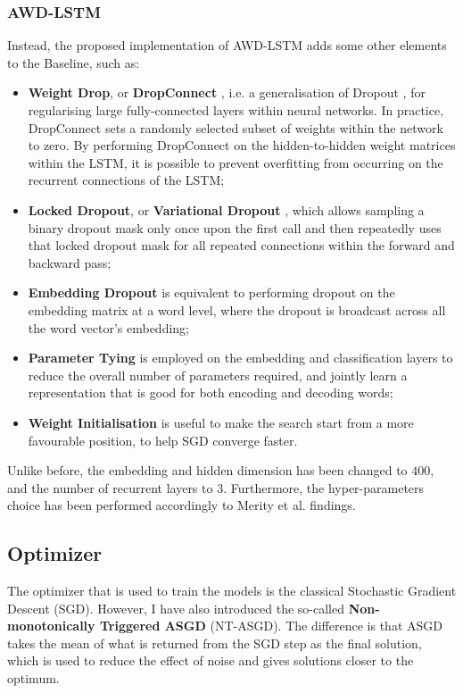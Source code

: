 \subsubsection{AWD-LSTM}
Instead, the proposed implementation of AWD-LSTM adds some other elements to the Baseline, such as:
\begin{itemize}
    \item \textbf{Weight Drop}, or \textbf{DropConnect} \cite{wanRegularizationNeuralNetworks2013}, i.e. a generalisation of Dropout \cite{hintonImprovingNeuralNetworks2012}, for regularising large fully-connected layers within neural networks. In practice, DropConnect sets a randomly selected subset of weights within the network to zero. By performing DropConnect on the hidden-to-hidden weight matrices within the LSTM, it is possible to prevent overfitting from occurring on the recurrent connections of the LSTM;
    \item \textbf{Locked Dropout}, or \textbf{Variational Dropout} \cite{galTheoreticallyGroundedApplication}, which allows sampling a binary dropout mask only once upon the first call and then repeatedly uses that locked dropout mask for all repeated connections within the forward and backward pass;
    \item \textbf{Embedding Dropout} \cite{galTheoreticallyGroundedApplication} is equivalent to performing dropout on the embedding matrix at a word level, where the dropout is broadcast across all the word vector's embedding;
    \item \textbf{Parameter Tying} is employed on the embedding and classification layers to reduce the overall number of parameters required, and jointly learn a representation that is good for both encoding and decoding words;
    \item \textbf{Weight Initialisation} is useful to make the search start from a more favourable position, to help SGD converge faster.
\end{itemize}
Unlike before, the embedding and hidden dimension has been changed to $400$, and the number of recurrent layers to 3. Furthermore, the hyper-parameters choice has been performed accordingly to Merity et al. findings.

\subsection{Optimizer}
The optimizer that is used to train the models is the classical Stochastic Gradient Descent (SGD). However, I have also introduced the so-called \textbf{Non-monotonically Triggered ASGD} (NT-ASGD). The difference is that ASGD takes the mean of what is returned from the SGD step as the final solution, which is used to reduce the effect of noise and gives solutions closer to the optimum.

